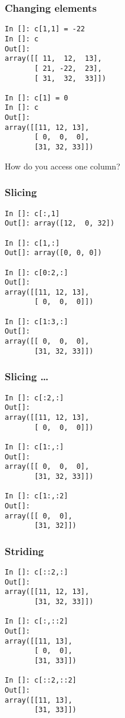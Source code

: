 \documentclass[14pt,compress]{beamer}
\begin{document}
\begin{frame}[fragile]
  \frametitle{Changing elements}
  \begin{small}
  \begin{lstlisting}
In []: c[1,1] = -22
In []: c
Out[]: 
array([[ 11,  12,  13],
       [ 21, -22,  23],
       [ 31,  32,  33]])

In []: c[1] = 0
In []: c
Out[]: 
array([[11, 12, 13],
       [ 0,  0,  0],
       [31, 32, 33]])
  \end{lstlisting}
  \end{small}
How do you access one \alert{column}?
\end{frame}

\begin{frame}[fragile]
  \frametitle{Slicing}
\begin{small}
  \begin{lstlisting}
In []: c[:,1]
Out[]: array([12,  0, 32])

In []: c[1,:]
Out[]: array([0, 0, 0])

In []: c[0:2,:]
Out[]: 
array([[11, 12, 13],
       [ 0,  0,  0]])

In []: c[1:3,:]
Out[]: 
array([[ 0,  0,  0],
       [31, 32, 33]])
  \end{lstlisting}
\end{small}
\end{frame}

\begin{frame}[fragile]
  \frametitle{Slicing \ldots}
\begin{small}
  \begin{lstlisting}
In []: c[:2,:]
Out[]: 
array([[11, 12, 13],
       [ 0,  0,  0]])

In []: c[1:,:]
Out[]: 
array([[ 0,  0,  0],
       [31, 32, 33]])

In []: c[1:,:2]
Out[]: 
array([[ 0,  0],
       [31, 32]])
  \end{lstlisting}

\end{small}
\end{frame}

\begin{frame}[fragile]
  \frametitle{Striding}
  \begin{small}
  \begin{lstlisting}
In []: c[::2,:]
Out[]: 
array([[11, 12, 13],
       [31, 32, 33]])

In []: c[:,::2]
Out[]: 
array([[11, 13],
       [ 0,  0],
       [31, 33]])

In []: c[::2,::2]
Out[]: 
array([[11, 13],
       [31, 33]])
  \end{lstlisting}
  \end{small}
\end{frame}
\end{document}
